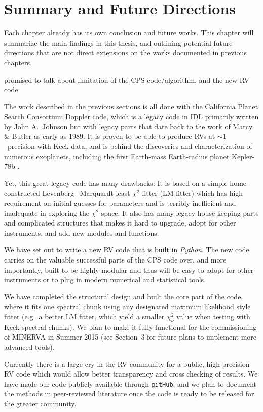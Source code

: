 \chapter{Summary and Future Directions}\label{chap:conclusion}

Each chapter already has its own conclusion and future works. This
chapter will summarize the main findings in this thesis, and outlining
potential future directions that are not direct extensions on the
works documented in previous chapters.

promised to talk about limitation of the CPS code/algorithm, and the
new RV code.

The work described in the previous sections is all done with the
California Planet Search Consortium Doppler code, which is a legacy
code in IDL primarily written by John A.\ Johnson but with legacy
parts that date back to the work of Marcy \& Butler as early as
1989. It is proven to be able to produce RVs at $\sim 1$
\mps\ precision with Keck data, and is behind the discoveries and
characterization of numerous exoplanets, including the first
Earth-mass Earth-radius planet Kepler-78b \citep{howard2013,pepe2013}.

Yet, this great legacy code has many drawbacks: It is based on a
simple home-constructed Levenberg–-Marquardt least $\chi^2$ fitter
(LM fitter) which has high requirement on initial guesses for
parameters and is terribly inefficient and inadequate in exploring the
$\chi^2$ space. It also has many legacy house keeping parts and
complicated structures that makes it hard to upgrade, adopt for other
instruments, and add new modules and functions.

We have set out to write a new RV code that is built in {\it Python}.
The new code carries on the valuable successful parts of the CPS code
over, and more importantly, built to be highly modular and thus will
be easy to adopt for other instruments or to plug in modern
numerical and statistical tools.

We have completed the structural design and built the core part of the
code, where it fits one spectral chunk using any designated maximum
likelihood style fitter (e.g.\ a better LM fitter, which yield a
smaller $\chi^2_\nu$ value when testing with Keck spectral chunks). We
plan to make it fully functional for the commissioning of MINERVA in
Summer 2015 (see Section~3 for future plans to implement more
advanced tools).

Currently there is a large cry in the RV community for a public,
high-precision RV code which would allow better transparency and cross
checking of results. We have made our code publicly available through
{\tt gitHub}, and we plan to document the methods in peer-reviewed
literature once the code is ready to be released for the greater
community.


